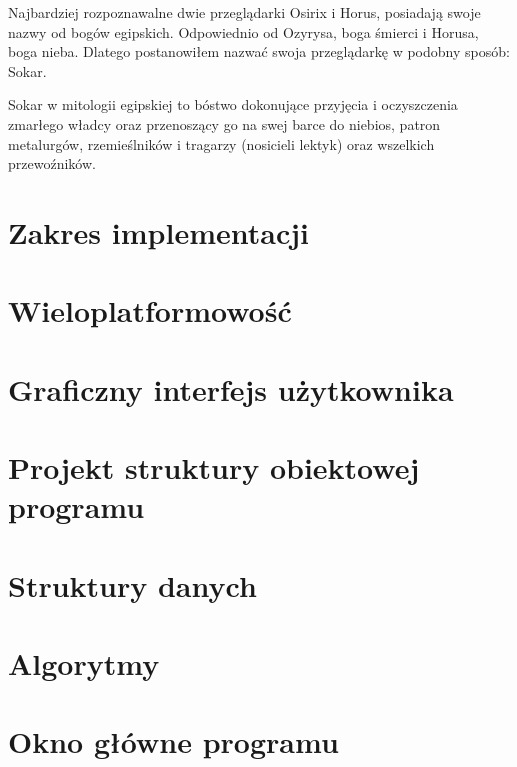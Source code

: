 
\par
Najbardziej rozpoznawalne dwie przeglądarki Osirix i Horus, posiadają swoje nazwy od bogów egipskich.
Odpowiednio od Ozyrysa, boga śmierci i Horusa, boga nieba.
Dlatego postanowiłem nazwać swoja przeglądarkę w podobny sposób: Sokar.
\par
Sokar w mitologii egipskiej to bóstwo dokonujące przyjęcia i oczyszczenia zmarłego władcy oraz przenoszący go na swej barce do niebios, patron metalurgów, rzemieślników i tragarzy (nosicieli lektyk) oraz wszelkich przewoźników.

\section{Zakres implementacji}


\section{Wieloplatformowość}


\section{Graficzny interfejs użytkownika}
\sokarclassExplanations


\section{Projekt struktury obiektowej programu}


\section{Struktury danych}


\section{Algorytmy}


\section{}


\section{}


\section{Okno główne programu}


